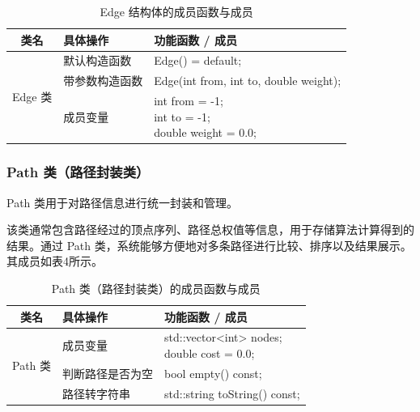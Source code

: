 \documentclass[UTF8,12pt,a4paper]{ctexart}
\begin{document}
\begin{table}[H]
\centering
\caption{Edge 结构体的成员函数与成员}
\renewcommand{\arraystretch}{1.3}
\begin{tabular}{|
c|
>{\centering\arraybackslash}m{4cm}|
>{\centering\arraybackslash}m{9cm}|}
\hline
\textbf{类名} & \textbf{具体操作} & \textbf{功能函数 / 成员} \\
\hline
\multirow{3}{*}{Edge 类}
& 默认构造函数
& Edge() = default; \\
\cline{2-3}

& 带参数构造函数
& Edge(int from, int to, double weight); \\
\cline{2-3}

& 成员变量
& {\centering
  int from = -1; \\[0.5ex]
  int to = -1; \\[0.5ex]
  double weight = 0.0;
}\\
\hline
\end{tabular}
\end{table}

\subsubsection{Path 类（路径封装类）}

Path 类用于对路径信息进行统一封装和管理。

该类通常包含路径经过的顶点序列、路径总权值等信息，用于存储算法计算得到的结果。通过 Path 类，系统能够方便地对多条路径进行比较、排序以及结果展示。其成员如表4所示。

\begin{table}[H]
\centering
\caption{Path 类（路径封装类）的成员函数与成员}
\renewcommand{\arraystretch}{1.3}
\begin{tabular}{|
c|
>{\centering\arraybackslash}m{4cm}|
>{\centering\arraybackslash}m{9cm}|}
\hline
\textbf{类名} & \textbf{具体操作} & \textbf{功能函数 / 成员} \\
\hline
\multirow{4}{*}{Path 类}
& 成员变量
& {\centering
  std::vector<int> nodes; \\[0.5ex]
  double cost = 0.0;
}\\
\cline{2-3}

& 判断路径是否为空
& bool empty() const; \\
\cline{2-3}

& 路径转字符串
& std::string toString() const; \\
\hline
\end{tabular}
\end{table}
\end{document}
